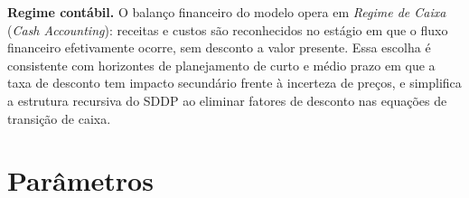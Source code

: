 \documentclass{article}
\begin{document}
\noindent\textbf{Regime contábil.} O balanço financeiro do modelo opera em \emph{Regime de
Caixa} (\emph{Cash Accounting}): receitas e custos são reconhecidos no estágio em que o
fluxo financeiro efetivamente ocorre, sem desconto a valor presente. Essa escolha é
consistente com horizontes de planejamento de curto e médio prazo em que a taxa de desconto
tem impacto secundário frente à incerteza de preços, e simplifica a estrutura recursiva do
SDDP ao eliminar fatores de desconto nas equações de transição de caixa.

\section{Parâmetros}
\end{document}
